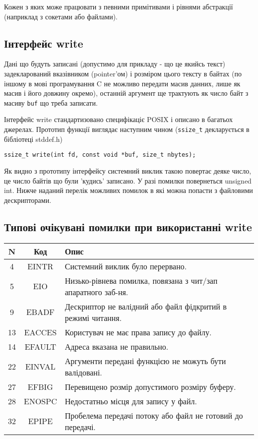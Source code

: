   Кожен з яких може працювати з певними примітивами і рівнями абстракції (наприклад з сокетами або файлами).

  \subsection{Інтерфейс write}
  Дані що будуть записані (допустимо для прикладу - що це якийсь текст) задекларований вказівником (pointer'ом) і розміром цього тексту в байтах (по іншому в мові програмування C не можливо передати масив данних, лише як масив і його довжину окремо), останній аргумент ще трактують як число байт з масиву \texttt{buf} що треба записати.

  Інтерфейс write стандартизовано специфікаціє POSIX і описано в багатьох джерелах. Прототип функції виглядає наступним чином (\texttt{ssize\_t} декларується в бібліотеці stddef.h)

  \texttt{ssize\_t write(int fd, const void *buf, size\_t nbytes);}

  Як видно з прототипу інтерфейсу системний виклик такою повертає деяке число, це число байтів що були 'кудись' записано. У разі помилки повернеться unsigned int. Нижче наданий перелік можливих помилок в які можна попасти з файловими дескрипторами.

  \subsection{Типові очікувані помилки при використанні write}

  \begin{center}
    \begin{tabular}{ | c | c | l | }
      \hline N & Код & Опис \\
      \hline 4 &  EINTR & Системний виклик було перервано. \\
      \hline 5 &  EIO & Низько-рівнева помилка, повязана з чит/зап апаратного заб-ня. \\
      \hline 9 & EBADF & Дескриптор не валідний або файл фідкритий в режимі читання. \\
      \hline 13 & EACCES & Користувач не має права запису до файлу. \\
      \hline 14 & EFAULT & Адреса вказана не правильно. \\
      \hline 22 & EINVAL & Аргументи передані функцією не можуть бути валідовані. \\
      \hline 27 & EFBIG & Перевищено розмір допустимого розміру буферу. \\
      \hline 28 & ENOSPC & Недостатньо місця для запису у файл. \\
      \hline 32 & EPIPE & Пробелема передачі потоку або файл не готовий до передачі. \\
      \hline
    \end{tabular}
  \end{center}

